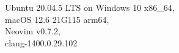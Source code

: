Ubuntu 20.04.5 LTS on Windows 10 x86\_64, \\
macOS 12.6 21G115 arm64, \\
Neovim v0.7.2, \\
clang-1400.0.29.102
